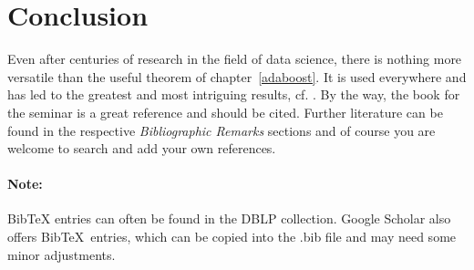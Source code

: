 \section{Conclusion}
\label{conclusion}

Even after centuries of research in the field of data science, 
there is nothing more versatile than the useful theorem of chapter~\ref{adaboost}. 
It is used everywhere and has led to the greatest and most intriguing results, cf. \cite{Someone03}. 
By the way, the book for the seminar \cite{SSBD14} is a great reference and should be cited.
Further literature can be found in the respective \emph{Bibliographic Remarks} sections and 
of course you are welcome to search and add your own references.

\paragraph*{Note:} Bib{\TeX} entries can often be found in the DBLP collection. 
Google Scholar also offers Bib\TeX~entries, which can be copied into the .bib file and may need some minor adjustments.